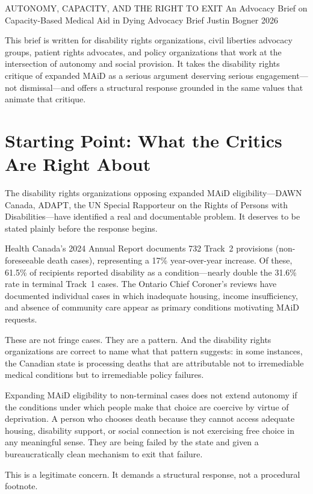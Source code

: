 \documentclass[11pt, letterpaper]{article}
\begin{document}
\campaigntitle%
  {AUTONOMY, CAPACITY, AND THE RIGHT TO EXIT}%
  {An Advocacy Brief on Capacity-Based Medical Aid in Dying}%
  {Advocacy Brief}%
  {Justin Bogner}%
  {2026}

\suitenote

\begin{policybox}[title={\sffamily\bfseries\small\color{C@accent}
  Who This Brief Is For}]
This brief is written for disability rights organizations, civil liberties advocacy groups,
patient rights advocates, and policy organizations that work at the intersection of
autonomy and social provision. It takes the disability rights critique of expanded MAiD
as a serious argument deserving serious engagement---not dismissal---and offers a
structural response grounded in the same values that animate that critique.
\end{policybox}

\bigskip

\section{Starting Point: What the Critics Are Right About}

The disability rights organizations opposing expanded MAiD eligibility---DAWN Canada, ADAPT,
the UN Special Rapporteur on the Rights of Persons with Disabilities---have identified a
real and documentable problem. It deserves to be stated plainly before the response begins.

Health Canada's 2024 Annual Report documents 732 Track~2 provisions (non-foreseeable death
cases), representing a 17\% year-over-year increase. Of these, 61.5\% of recipients reported
disability as a condition---nearly double the 31.6\% rate in terminal Track~1 cases. The
Ontario Chief Coroner's reviews have documented individual cases in which inadequate housing,
income insufficiency, and absence of community care appear as primary conditions motivating
MAiD requests.

These are not fringe cases. They are a pattern. And the disability rights organizations are
correct to name what that pattern suggests: in some instances, the Canadian state is
processing deaths that are attributable not to irremediable medical conditions but to
irremediable policy failures.

\begin{findingbox}[title={\sffamily\bfseries\small\color{C@accent}
  The Concern, Stated Fairly}]
Expanding MAiD eligibility to non-terminal cases does not extend autonomy if the conditions
under which people make that choice are coercive by virtue of deprivation. A person who
chooses death because they cannot access adequate housing, disability support, or social
connection is not exercising free choice in any meaningful sense. They are being failed by
the state and given a bureaucratically clean mechanism to exit that failure.

This is a legitimate concern. It demands a structural response, not a procedural footnote.
\end{findingbox}
\end{document}

